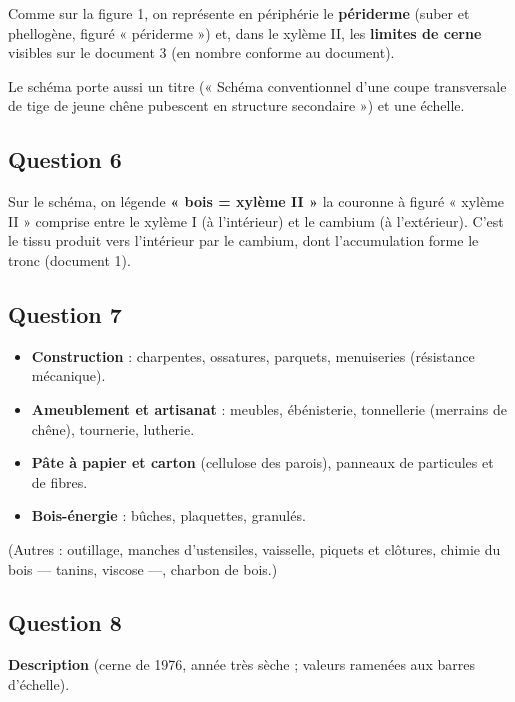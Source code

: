 \documentclass[11pt,a4paper]{article}
\providecommand{\tightlist}{\setlength{\itemsep}{0pt}\setlength{\parskip}{0pt}}
\begin{document}
Comme sur la figure 1, on représente en périphérie le \textbf{périderme} (suber et phellogène, figuré « périderme ») et, dans le xylème II, les \textbf{limites de cerne} visibles sur le document 3 (en nombre conforme au document).

Le schéma porte aussi un titre (« Schéma conventionnel d'une coupe transversale de tige de jeune chêne pubescent en structure secondaire ») et une échelle.

\hypertarget{question-6}{%
\subsection{Question 6}\label{question-6}}

Sur le schéma, on légende \textbf{« bois = xylème II »} la couronne à figuré « xylème II » comprise entre le xylème I (à l'intérieur) et le cambium (à l'extérieur). C'est le tissu produit vers l'intérieur par le cambium, dont l'accumulation forme le tronc (document 1).

\hypertarget{question-7}{%
\subsection{Question 7}\label{question-7}}

\begin{itemize}
\tightlist
\item
  \textbf{Construction} : charpentes, ossatures, parquets, menuiseries (résistance mécanique).
\item
  \textbf{Ameublement et artisanat} : meubles, ébénisterie, tonnellerie (merrains de chêne), tournerie, lutherie.
\item
  \textbf{Pâte à papier et carton} (cellulose des parois), panneaux de particules et de fibres.
\item
  \textbf{Bois-énergie} : bûches, plaquettes, granulés.
\end{itemize}

(Autres : outillage, manches d'ustensiles, vaisselle, piquets et clôtures, chimie du bois --- tanins, viscose ---, charbon de bois.)

\hypertarget{question-8}{%
\subsection{Question 8}\label{question-8}}

\textbf{Description} (cerne de 1976, année très sèche ; valeurs ramenées aux barres d'échelle).
\end{document}
